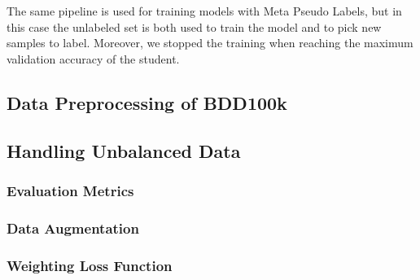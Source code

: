 The same pipeline is used for training models with Meta Pseudo Labels, but in 
this case the unlabeled set is both used to train the model and to pick new 
samples to label. Moreover, we stopped the training when reaching the maximum 
validation accuracy of the student. 

\subsection{Data Preprocessing of BDD100k}


\subsection{Handling Unbalanced Data}

\subsubsection{Evaluation Metrics}

\subsubsection{Data Augmentation}



\subsubsection{Weighting Loss Function}


